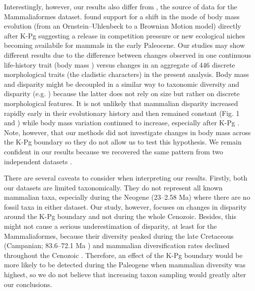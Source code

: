 \documentclass[12pt,letterpaper]{article}
\begin{document}
Interestingly, however, our results also differ from \cite{Slater2012MEE}, the source of data for the Mammaliaformes dataset.
\cite{Slater2012MEE} found support for a shift in the mode of body mass evolution (from an Ornstein--Uhlenbeck to a Brownian Motion model) directly after K-Pg suggesting a release in competition pressure or new ecological niches becoming availabile for mammals in the early Paleocene.
Our studies may show different results due to the difference between changes observed in one continuous life-history trait (body mass \cite{Slater2012MEE}) versus changes in an aggregate of 446 discrete morphological traits (the cladistic characters) in the present analysis.
Body mass and disparity might be decoupled in a similar way to taxonomic diversity and disparity (e.g. \cite{slaterCetacean,ruta2013,hopkinsdecoupling2013}) because the latter does not rely on size but rather on discrete morphological features.
It is not unlikely that mammalian disparity increased rapidly early in their evolutionary history and then remained constant (Fig. 1 and \cite{Close2015,Lee2015R759}) while body mass variation continued to increase, especially after K-Pg \cite{Slater2012MEE}.
Note, however, that our methods did not investigate changes in body mass across the K-Pg boundary so they do not allow us to test this hypothesis.
We remain confident in our results because we recovered the same pattern from two independent datasets \cite{Slater2012MEE,beckancient2014}.

There are several caveats to consider when interpreting our results. 
Firstly, both our datasets are limited taxonomically.
They do not represent all known mammalian taxa, especially during the Neogene (23--2.58 Ma) where there are no fossil taxa in either dataset.
Our study, however, focuses on changes in disparity around the K-Pg boundary and not during the whole Cenozoic.
Besides, this might not cause a serious underestimation of disparity, at least for the Mammaliaformes, because their diversity peaked during the late Cretaceous (Campanian; 83.6--72.1 Ma \cite{Newham201432}) and mammalian diversification rates declined throughout the Cenozoic \cite{Raia2012}.
Therefore, an effect of the K-Pg boundary would be more likely to be detected during the Paleogene when mammalian diversity was highest, so we do not believe that increasing taxon sampling would greatly alter our conclusions.
\end{document}
